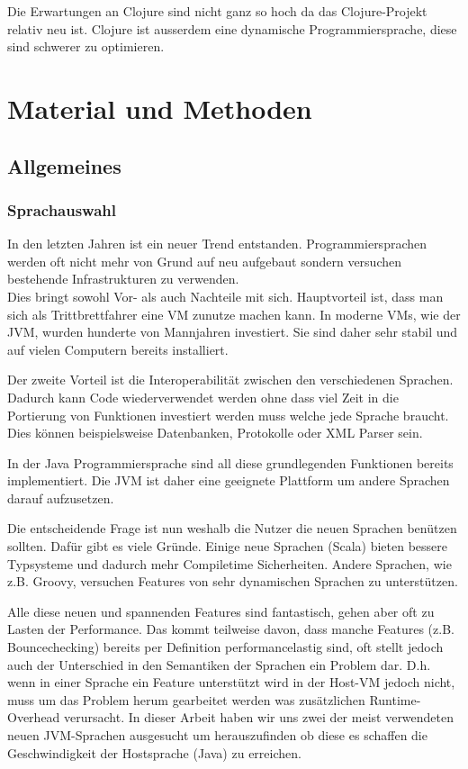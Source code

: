 \documentclass{fancydocument}
\begin{document}
Die Erwartungen an Clojure sind nicht ganz so hoch da das Clojure-Projekt relativ neu ist. Clojure 
ist ausserdem eine dynamische Programmiersprache, diese sind schwerer zu optimieren.


\section{Material und Methoden}

\subsection{Allgemeines}

\subsubsection{Sprachauswahl}

In den letzten Jahren ist ein neuer Trend
entstanden. Programmiersprachen werden oft nicht mehr von Grund auf neu
aufgebaut sondern versuchen bestehende Infrastrukturen zu verwenden.
\\
Dies bringt sowohl Vor- als auch Nachteile mit sich. Hauptvorteil ist, dass
man sich als Trittbrettfahrer eine VM zunutze machen kann. In moderne
VMs, wie der JVM, wurden hunderte von Mannjahren investiert. Sie sind
daher sehr stabil und auf vielen Computern bereits installiert.

Der zweite Vorteil ist die Interoperabilität zwischen den
verschiedenen Sprachen. Dadurch kann Code
wiederverwendet werden ohne dass viel Zeit in die Portierung von
Funktionen investiert werden muss welche jede Sprache braucht. Dies können beispielsweise Datenbanken, Protokolle oder XML Parser sein.

In der Java Programmiersprache sind all diese grundlegenden Funktionen
bereits implementiert. Die JVM ist daher eine geeignete Plattform um andere
Sprachen darauf aufzusetzen.

Die entscheidende Frage ist nun weshalb die Nutzer die neuen
Sprachen ben\"utzen sollten. Dafür gibt es viele Gründe. Einige neue
Sprachen (Scala) bieten bessere Typsysteme und dadurch mehr
Compiletime Sicherheiten. Andere Sprachen, wie z.B. Groovy, versuchen Features
von sehr dynamischen Sprachen zu unterst\"utzen.

Alle diese neuen und spannenden Features sind fantastisch, gehen aber
oft zu Lasten der Performance. Das kommt teilweise davon, dass manche Features (z.B. Bouncechecking)
bereits per Definition performancelastig sind, oft stellt jedoch auch der Unterschied in den Semantiken der Sprachen ein Problem dar. D.h. wenn in einer Sprache ein Feature
unterst\"utzt wird in der Host-VM jedoch nicht, muss um das Problem herum
gearbeitet werden was zus\"atzlichen Runtime-Overhead verursacht. In dieser
Arbeit haben wir uns zwei der meist verwendeten neuen JVM-Sprachen
ausgesucht um herauszufinden ob diese es schaffen die Geschwindigkeit
der Hostsprache (Java) zu erreichen.
\end{document}
